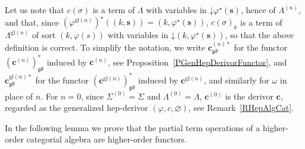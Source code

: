 \documentclass[a4paper, reqno
]{amsart}
\newcommand{\vs}[1]{\mathbin{\downarrow}#1}
\newcommand{\gd}{\mathfrak{gd}}              %
\newcommand{\gl}{\mathrm{gl}}                %
\theoremstyle{plain}
\theoremstyle{definition}
\begin{document}
Let us note that $c(\sigma)$ is a term of $\Lambda$ with variables in $\vs{\varphi^{\star}(\mathbf{s})}$, hence of $\Lambda^{(n)}$, and that, since $(\varphi^{\gl(n)})^{\star}((k,\mathbf{s}))=(k,\varphi^{\star}(\mathbf{s}))$, $c(\sigma)_{k}$ is a term of $\Lambda^{\gl(n)}$ of sort $(k,\varphi(s))$ with variables in $\vs{(k,\varphi^{\star}(\mathbf{s}))}$, so that the above definition is correct.
To simplify the notation, we write $\mathbf{c}^{(n)\ast}_{\gd}$ for the functor $(\mathbf{c}^{(n)})^{\ast}_{\gd}$ induced by $\mathbf{c}^{(n)}$, see Proposition~\ref{PGenHepDerivorFunctor}, and $\mathbf{c}^{\gl(n)\ast}_{\gd}$ for the functor $(\mathbf{c}^{\gl(n)})^{\ast}_{\gd}$ induced by $\mathbf{c}^{\gl(n)}$, and similarly for $\omega$ in place of $n$.
For $n=0$, since $\Sigma^{(0)}=\Sigma$ and $\Lambda^{(0)}=\Lambda$, $\mathbf{c}^{(0)}$ is the derivor $\mathbf{c}$, regarded as the generalized hep-derivor $(\varphi,c,\varnothing)$, see Remark~\ref{RHepAlgCat}.

In the following lemma we prove that the partial term operations of a higher-order categorial algebra are higher-order functors.
\end{document}
